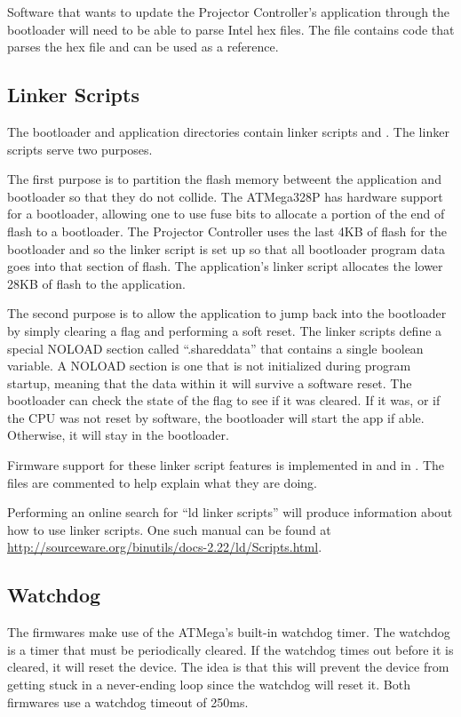 \documentclass{article}
\begin{document}
Software that wants to update the Projector Controller's application through the bootloader will
need to be able to parse Intel hex files.  The file  contains code
that parses the hex file and can be used as a reference.

\subsection{Linker Scripts} \label{ssec:FWLinkerScripts}
The bootloader and application directories contain linker scripts  and
.  The linker scripts serve two purposes.

The first purpose is to partition the flash memory betweent the application and bootloader so that
they do not collide.  The ATMega328P has hardware support for a bootloader, allowing one to use fuse
bits to allocate a portion of the end of flash to a bootloader.  The Projector Controller uses the
last 4KB of flash for the bootloader and so the linker script is set up so that all bootloader
program data goes into that section of flash.  The application's linker script allocates the lower
28KB of flash to the application.

The second purpose is to allow the application to jump back into the bootloader by simply clearing a
flag and performing a soft reset.  The linker scripts define a special NOLOAD section called
``.shareddata'' that contains a single boolean variable.  A NOLOAD section is one that is not
initialized during program startup, meaning that the data within it will survive a software reset.
The bootloader can check the state of the flag to see if it was cleared.  If it was, or if the CPU
was not reset by software, the bootloader will start the app if able.  Otherwise, it will stay in
the bootloader.

Firmware support for these linker script features is implemented in  and
 in .  The files are commented to help explain what
they are doing.

Performing an online search for ``ld linker scripts'' will produce information about how to use
linker scripts.  One such manual can be found at
\url{http://sourceware.org/binutils/docs-2.22/ld/Scripts.html}.

\subsection{Watchdog} \label{ssec:FWWatchdog}
The firmwares make use of the ATMega's built-in watchdog timer.  The watchdog is a timer that must
be periodically cleared.  If the watchdog times out before it is cleared, it will reset the device.
The idea is that this will prevent the device from getting stuck in a never-ending loop since the
watchdog will reset it.  Both firmwares use a watchdog timeout of 250ms.
\end{document}
